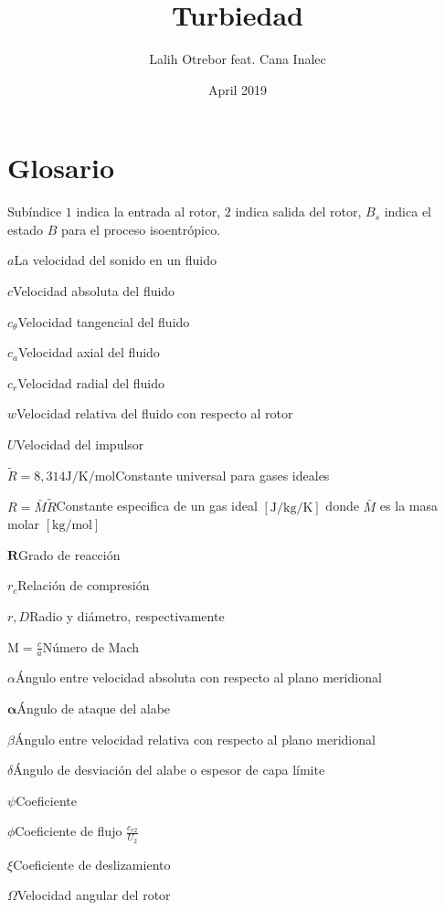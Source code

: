 \documentclass{article}
\title{Turbiedad}
\author{Lalih Otrebor feat. Cana Inalec}
\date{April 2019}
\newcommand{\glossentry}[2]{$#1$\indent #2 \par \vspace{.4cm} }
\newcommand{\sib}[1]{\ensuremath{\left[\si{#1}\right]}}
\newcommand{\attackangle}{{\ensuremath{\bm{\alpha}}}}
\newcommand{\cteuniversal}{\ensuremath{\tilde{R}}}
\newcommand{\molarmass}{\ensuremath{{\scriptstyle \bar{M}}}}
\newcommand{\speedsound}{a}
\newcommand{\ctan}[1]{\ensuremath{c_{\theta #1}}}
\newcommand{\crad}[1]{\ensuremath{c_{r #1}}}
\newcommand{\cax}[1]{\ensuremath{c_{a #1}}}
\newcommand{\Mach}{\textrm{M}}
\newcommand{\slip}{\xi}
\newcommand{\slipangle}{\ensuremath{\theta_d}}
\newcommand{\degreeofreaction}{{\bm{R}}}
\newcommand{\relcomp}{\ensuremath{r_c}}
\begin{document}
\maketitle

\section*{Glosario}
Subíndice $1$ indica la entrada al rotor, $2$ indica salida del rotor, $B_s$ indica el estado $B$ para el proceso isoentrópico.
\par

\glossentry{\speedsound}{La velocidad del sonido en un fluido}


\glossentry{c}{Velocidad absoluta del fluido}
\glossentry{\ctan{}}{Velocidad tangencial del fluido}
\glossentry{\cax{}}{Velocidad axial del fluido}

\glossentry{\crad{}}{Velocidad radial del fluido}
\glossentry{w}{Velocidad relativa del fluido con respecto al rotor}
\glossentry{U}{Velocidad del impulsor}
\glossentry{\cteuniversal=8,314 \si{\joule \per \kelvin\per \mole}}{Constante universal para gases ideales}
\glossentry{R=\molarmass\cteuniversal}{Constante especifica de un gas ideal \sib{\joule \per \kilogram \per \kelvin} donde \molarmass{} es la masa molar \sib{\kilogram \per \mole}}
\glossentry{\degreeofreaction}{Grado de reacción}
\glossentry{\relcomp}{Relación de compresión}
\glossentry{r,D}{Radio y diámetro, respectivamente}
\glossentry{\Mach=\frac{c}{\speedsound}}{Número de Mach}
\glossentry{\alpha}{Ángulo entre velocidad absoluta con respecto al plano meridional}
\glossentry{\attackangle}{Ángulo de ataque del alabe}
\glossentry{\beta}{Ángulo entre velocidad relativa con respecto al plano meridional}
\glossentry{\delta}{Ángulo de desviación del alabe o espesor de capa límite}
\glossentry{\psi}{Coeficiente}
\glossentry{\phi}{Coeficiente de flujo $\frac{\crad{2}}{U_2}$}
\glossentry{\slip}{Coeficiente de deslizamiento}
\glossentry{\Omega}{Velocidad angular del rotor}



\end{document}
